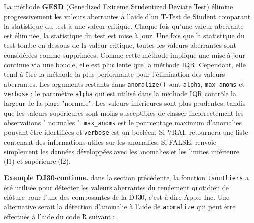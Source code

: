 \par La méthode \textbf{GESD} (Generlized Extreme Studentized Deviate Test) élimine progressivement les valeurs aberrantes à l'aide d'un T-Test de Student comparant la statistique du test à une valeur critique. Chaque fois qu'une valeur aberrante est éliminée, la statistique du test est mise à jour. Une fois que la statistique du test tombe en dessous de la valeur critique, toutes les valeurs aberrantes sont considérées comme supprimées. Comme cette méthode implique une mise à jour continue via une boucle, elle est plus lente que la méthode IQR. Cependant, elle tend à être la méthode la plus performante pour l'élimination des valeurs aberrantes. Les arguments restants dans \verb|anomalize()| sont \verb|alpha|, 
\verb|max_anoms| et \verb|verbose| ; le paramètre \verb|alpha| qui est utilisé dans la méthode IQR contrôle la largeur de la plage "normale". Les valeurs inférieures sont plus prudentes, tandis que les valeurs supérieures sont moins susceptibles de classer incorrectement les observations " normales ". \verb|max_anoms| est le pourcentage maximum d'anomalies pouvant être identifiées et \verb|verbose| est un booléen. Si VRAI, retournera une liste contenant des informations utiles sur les anomalies. Si FALSE, renvoie simplement les données développées avec les anomalies et les limites inférieure (l1) et supérieure (l2). \par \textbf{Exemple DJ30-continue.} dans la section précédente, la fonction \verb|tsoutliers| a été utilisée pour détecter les valeurs aberrantes du rendement quotidien de clôture pour l'une des composantes de la DJ30, c'est-à-dire Apple Inc. Une alternative serait la détection d'anomalie à l'aide de \verb|anomalize| qui peut être effectuée à l'aide du code R suivant :

